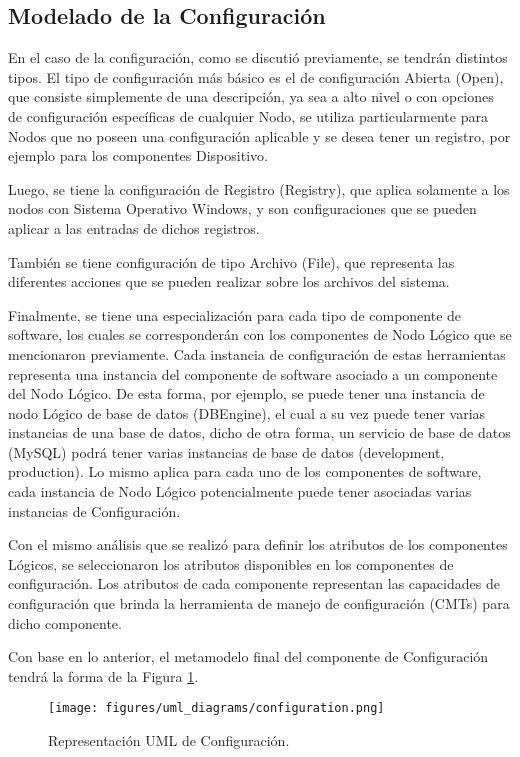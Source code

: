 \subsection{Modelado de la Configuración}
En el caso de la configuración, como se discutió previamente, se tendrán distintos tipos. El tipo de configuración más básico es el de configuración Abierta (Open), que consiste simplemente de una descripción, ya sea a alto nivel o con opciones de configuración específicas de cualquier Nodo, se utiliza particularmente para Nodos que no poseen una configuración aplicable y se desea tener un registro, por ejemplo para los componentes Dispositivo.

Luego, se tiene la configuración de Registro (Registry), que aplica solamente a los nodos con Sistema Operativo Windows, y son configuraciones que se pueden aplicar a las entradas de dichos registros.

También se tiene configuración de tipo Archivo (File), que representa las diferentes acciones que se pueden realizar sobre los archivos del sistema.

Finalmente, se tiene una especialización para cada tipo de componente de software, los cuales se corresponderán con los componentes de Nodo Lógico que se mencionaron previamente. 
Cada instancia de configuración de estas herramientas representa una instancia del componente de software asociado a un componente del Nodo Lógico. De esta forma, por ejemplo, se puede tener una instancia de nodo Lógico de base de datos (DBEngine), el cual a su vez puede tener varias instancias de una base de datos, dicho de otra forma, un servicio de base de datos (MySQL) podrá tener varias instancias de base de datos (development, production).
Lo mismo aplica para cada uno de los componentes de software, cada instancia de Nodo Lógico potencialmente puede tener asociadas varias instancias de Configuración.

Con el mismo análisis que se realizó para definir los atributos de los componentes Lógicos, se seleccionaron los atributos disponibles en los componentes de configuración. Los atributos de cada componente representan las capacidades de configuración que brinda la herramienta de manejo de configuración (CMTs) para dicho componente.

Con base en lo anterior, el metamodelo final del componente de Configuración tendrá la forma de la Figura \ref{fig:uml:configuration}.

\begin{figure}[htbp]
    \centering
    \texttt{[image: figures/uml\_diagrams/configuration.png]}
    \caption{Representación UML de Configuración.}
    \label{fig:uml:configuration}
\end{figure}


